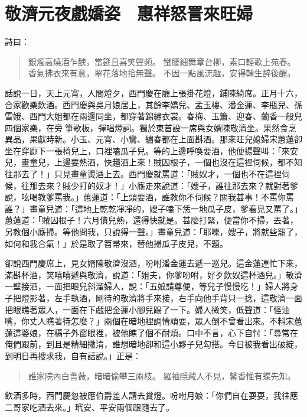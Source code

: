 
\chapter{敬濟元夜戲嬌姿　惠祥怒詈來旺婦}

詩曰：
\begin{quote}
銀燭高燒酒乍醺，當筵且喜笑聲頻。
蠻腰細舞章台柳，素口輕歌上苑春。
香氣拂衣來有意，翠花落地拾無聲。
不因一點風流趣，安得韓生醉後醒。
\end{quote}

話說一日，天上元宵，人間燈夕，西門慶在廳上張掛花燈，鋪陳綺席。正月十六，合家歡樂飲酒。西門慶與吳月娘居上，其餘李嬌兒、孟玉樓、潘金蓮、李瓶兒、孫雪娥、西門大姐都在兩邊同坐，都穿著錦繡衣裳。春梅、玉簫、迎春、蘭香一般兒四個家樂，在旁𢺈箏歌板，彈唱燈詞。獨於東首設一席與女婿陳敬濟坐。果然食烹異品，果獻時新。小玉、元宵、小鸞、繡春都在上面斟酒。那來旺兒媳婦宋蕙蓮卻坐在穿廊下一張椅兒上，口裡嗑瓜子兒。等的上邊呼喚要酒，他便揚聲叫：「來安兒，畫童兒，上邊要熱酒，快趲酒上來！賊囚根子，一個也沒在這裡伺候，都不知往那去了！」只見畫童燙酒上去。西門慶就罵道：「賊奴才，一個也不在這裡伺候，往那去來？賊少打的奴才！」小廝走來說道：「嫂子，誰往那去來？就對著爹說，吆喝教爹罵我。」蕙蓮道：「上頭要酒，誰教你不伺候？關我甚事！不罵你罵誰？」畫童兒道：「這地上乾乾凈凈的，嫂子嗑下恁一地瓜子皮，爹看見又罵了。」蕙蓮道：「賊囚根子！六月債兒熱，還得快就是。甚麼打緊，便當你不掃，丟著，另教個小廝掃。等他問我，只說得一聲。」畫童兒道：「耶嚛，嫂子，將就些罷了，如何和我合氣！」於是取了笤帚來，替他掃瓜子皮兒，不題。

卻說西門慶席上，見女婿陳敬濟沒酒，吩咐潘金蓮去遞一巡兒。這金蓮連忙下來，滿斟杯酒，笑嘻嘻遞與敬濟，說道：「姐夫，你爹吩咐，好歹飲奴這杯酒兒。」敬濟一壁接酒，一面把眼兒斜溜婦人，說：「五娘請尊便，等兒子慢慢吃！」婦人將身子把燈影著，左手執酒，剛待的敬濟將手來接，右手向他手背只一捻，這敬濟一面把眼瞧著眾人，一面在下戲把金蓮小腳兒踢了一下。婦人微笑，低聲道：「怪油嘴，你丈人瞧著待怎麼？」兩個在暗地裡調情頑耍，眾人倒不曾看出來。不料宋蕙蓮這婆娘，在槅子外窗眼裡，被他瞧了個不耐煩。口中不言，心下自忖：「尋常在俺們跟前，到且是精細撇清，誰想暗地卻和這小夥子兒勾搭。今日被我看出破綻，到明日再搜求我，自有話說。」正是：
\begin{quote}
誰家院內白薔薇，暗暗偷攀三兩枝。
羅袖隱藏人不見，馨香惟有蝶先知。
\end{quote}

飲酒多時，西門慶忽被應伯爵差人請去賞燈。吩咐月娘：「你們自在耍耍，我往應二哥家吃酒去來。」玳安、平安兩個跟隨去了。

